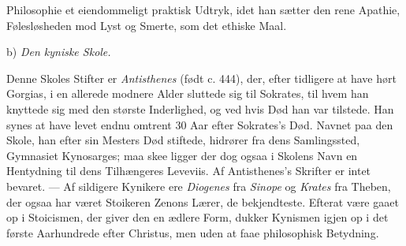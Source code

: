 \documentclass[12pt,a4paper]{book}
\newcommand{\gk}[1]{\textit{#1}}
\begin{document}
Philosophie et eiendommeligt praktisk Udtryk, idet han sætter
den rene Apathie, Følesløsheden mod Lyst og Smerte, som
det ethiske Maal.

\begin{center}
b) \emph{Den kyniske Skole.}
\end{center}
Denne Skoles Stifter er \emph{Antisthenes} (født c. 444), der,
efter tidligere at have hørt Gorgias, i en allerede modnere
Alder sluttede sig til Sokrates, til hvem han knyttede sig med
den største Inderlighed, og ved hvis Død han var tilstede.
Han synes at have levet endnu omtrent 30 Aar efter Sokrates's
Død. Navnet paa den Skole, han efter sin Mesters Død stiftede,
hidrører fra dens Samlingssted, Gymnasiet Kynosarges; maa\-%
skee ligger der dog ogsaa i Skolens Navn en Hentydning til
dens Tilhængeres Leveviis. Af Antisthenes's Skrifter er intet
bevaret. --- Af sildigere Kynikere ere \emph{Diogenes} fra \emph{Sinope}
og \emph{Krates} fra Theben, der ogsaa har været Stoikeren Zenons
Lærer, de bekjendteste. Efterat være gaaet op i Stoicismen,
der giver den en ædlere Form, dukker Kynismen igjen op i
det første Aarhundrede efter Christus, men uden at faae
philosophisk Betydning.
\end{document}

